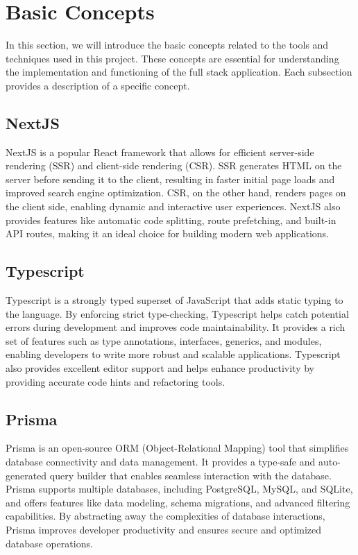 \chapter{Basic Concepts}

In this section, we will introduce the basic concepts related to the tools and techniques used in this project. These concepts are essential for understanding the implementation and functioning of the full stack application. Each subsection provides a description of a specific concept.

\section{NextJS}
NextJS is a popular React framework that allows for efficient server-side rendering (SSR) and client-side rendering (CSR). SSR generates HTML on the server before sending it to the client, resulting in faster initial page loads and improved search engine optimization. CSR, on the other hand, renders pages on the client side, enabling dynamic and interactive user experiences. NextJS also provides features like automatic code splitting, route prefetching, and built-in API routes, making it an ideal choice for building modern web applications.

\section{Typescript}
Typescript is a strongly typed superset of JavaScript that adds static typing to the language. By enforcing strict type-checking, Typescript helps catch potential errors during development and improves code maintainability. It provides a rich set of features such as type annotations, interfaces, generics, and modules, enabling developers to write more robust and scalable applications. Typescript also provides excellent editor support and helps enhance productivity by providing accurate code hints and refactoring tools.

\section{Prisma}
Prisma is an open-source ORM (Object-Relational Mapping) tool that simplifies database connectivity and data management. It provides a type-safe and auto-generated query builder that enables seamless interaction with the database. Prisma supports multiple databases, including PostgreSQL, MySQL, and SQLite, and offers features like data modeling, schema migrations, and advanced filtering capabilities. By abstracting away the complexities of database interactions, Prisma improves developer productivity and ensures secure and optimized database operations.

